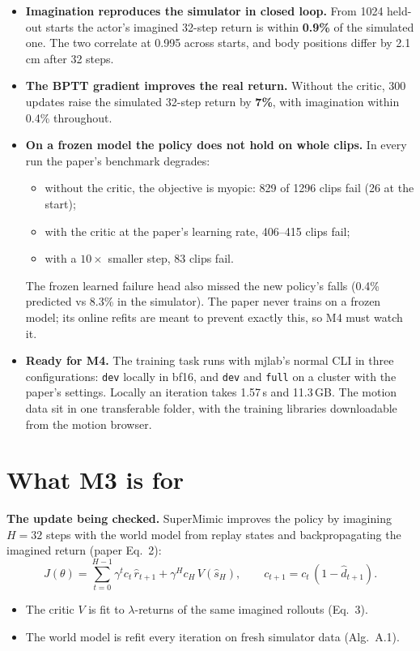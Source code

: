 \documentclass[10pt]{article}
\begin{document}
\begin{itemize}
  \item \textbf{Imagination reproduces the simulator in closed loop.} From 1024 held-out starts the
  actor's imagined 32-step return is within \textbf{0.9\%} of the simulated one. The two correlate at
  0.995 across starts, and body positions differ by 2.1\,cm after 32 steps.
  \item \textbf{The BPTT gradient improves the real return.} Without the critic, 300 updates raise the
  simulated 32-step return by \textbf{7\%}, with imagination within 0.4\% throughout.
  \item \textbf{On a frozen model the policy does not hold on whole clips.} In every run the paper's
  benchmark degrades:
  \begin{itemize}
    \item without the critic, the objective is myopic: 829 of 1296 clips fail (26 at the start);
    \item with the critic at the paper's learning rate, 406--415 clips fail;
    \item with a $10\times$ smaller step, 83 clips fail.
  \end{itemize}
  The frozen learned failure head also missed the new policy's falls (0.4\% predicted vs 8.3\% in the
  simulator). The paper never trains on a frozen model; its online refits are meant to prevent exactly
  this, so M4 must watch it.
  \item \textbf{Ready for M4.} The training task runs with mjlab's normal CLI in three
  configurations: \texttt{dev} locally in bf16, and \texttt{dev} and \texttt{full} on a cluster with
  the paper's settings. Locally an iteration takes 1.57\,s and 11.3\,GB. The motion data sit in one
  transferable folder, with the training libraries downloadable from the motion browser.
\end{itemize}


\section{What M3 is for}

\textbf{The update being checked.} SuperMimic improves the policy by imagining $H = 32$ steps with
the world model from replay states and backpropagating the imagined return (paper Eq.~2):
\[
J(\theta) = \sum_{t=0}^{H-1} \gamma^t c_t\, \hat r_{t+1} + \gamma^H c_H\, V(\hat s_H),
\qquad c_{t+1} = c_t\,(1 - \hat d_{t+1}).
\]
\begin{itemize}
  \item The critic $V$ is fit to $\lambda$-returns of the same imagined rollouts (Eq.~3).
  \item The world model is refit every iteration on fresh simulator data (Alg.~A.1).
\end{itemize}
\end{document}
